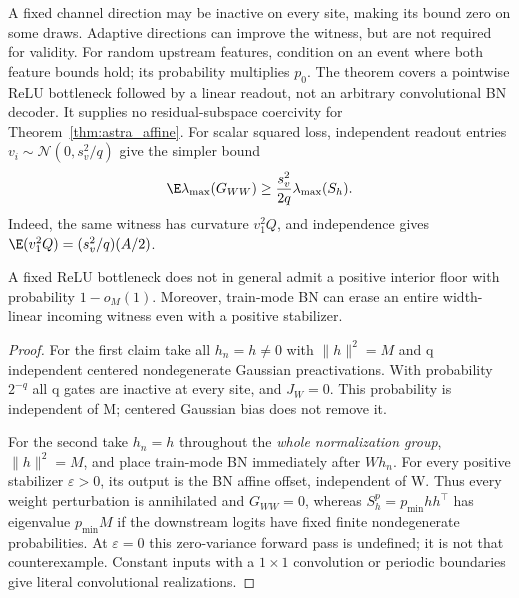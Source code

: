 \begin{remark}
A fixed channel direction may be inactive on every site, making its
bound zero on some draws. Adaptive directions can improve the witness,
but are not required for validity. For random upstream features, condition
on an event where both feature bounds hold; its probability multiplies
$p_0$. The theorem covers a pointwise ReLU bottleneck followed by a
linear readout, not an arbitrary convolutional BN decoder. It supplies
no residual-subspace coercivity for Theorem~\ref{thm:astra_affine}.
For scalar squared loss, independent readout entries
$v_i\sim\mathcal N(0,s_v^2/q)$ give the simpler bound
\[
 \E\lambda_{\max}(G_{WW})\ge\frac{s_v^2}{2q}\lambda_{\max}(S_h).
\]
Indeed, the same witness has curvature $v_1^2Q$, and independence gives
$\E(v_1^2Q)=(s_v^2/q)(A/2)$.
\end{remark}

\begin{proposition}
\label{prop:astra_bottleneck_counter}
A fixed ReLU bottleneck does not in general admit a positive interior
floor with probability $1-o_M(1)$. Moreover, train-mode BN can erase
an entire width-linear incoming witness even with a positive stabilizer.
\end{proposition}
\begin{proof}
For the first claim take all $h_n=h\ne0$ with $\|h\|^2=M$ and q
independent centered nondegenerate Gaussian preactivations. With
probability $2^{-q}$ all q gates are inactive at every site, and
$J_W=0$. This probability is independent of M; centered Gaussian bias
does not remove it.

For the second take $h_n=h$ throughout the \emph{whole normalization
group}, $\|h\|^2=M$, and place train-mode BN immediately after $Wh_n$.
For every positive stabilizer $\varepsilon>0$, its output is the BN
affine offset, independent of W. Thus every weight perturbation is
annihilated and $G_{WW}=0$, whereas
$S_h^p=p_{\min}hh^\top$ has eigenvalue $p_{\min}M$ if the downstream
logits have fixed finite nondegenerate probabilities. At
$\varepsilon=0$ this zero-variance forward pass is undefined; it is
not that counterexample. Constant inputs with a $1\times1$ convolution
or periodic boundaries give literal convolutional realizations.
\end{proof}

